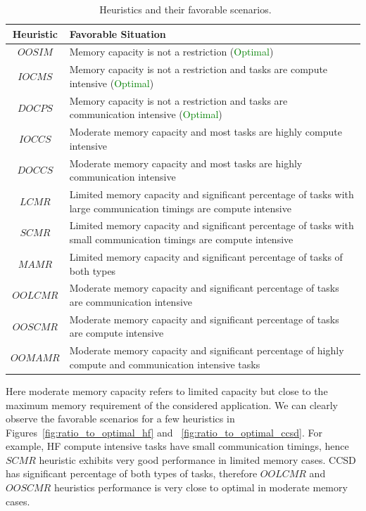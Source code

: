 \documentclass[sigconf]{acmart}
\begin{document}
{		
		\begin{table}[htb]
			\begin{tabular}{|c|p{6.5cm}|}
				\hline
				\textbf{Heuristic} & \textbf{\hspace{2cm}Favorable Situation} \\ \hline
				$OOSIM$ & Memory capacity is not a restriction (\textcolor{green}{Optimal}) \\ \hline
				$IOCMS$ & Memory capacity is not a restriction and tasks are compute intensive (\textcolor{green}{Optimal}) \\ \hline
				$DOCPS$ & Memory capacity is not a restriction and tasks are communication intensive (\textcolor{green}{Optimal}) \\ \hline
				$IOCCS$ & Moderate memory capacity and most tasks are highly compute intensive \\ \hline
				$DOCCS$ & Moderate memory capacity and most tasks are highly communication intensive \\ \hline
				$LCMR$ & Limited memory capacity and significant percentage of tasks with large communication timings are compute intensive\\ \hline
				$SCMR$ & Limited memory capacity and significant percentage of tasks with small communication timings are compute intensive\\ \hline
				$MAMR$ & Limited memory capacity and significant percentage of tasks of both types\\ \hline
				$OOLCMR$ & Moderate memory capacity and significant percentage of tasks are communication intensive\\ \hline
				$OOSCMR$ & Moderate memory capacity and significant percentage of tasks are compute intensive \\ \hline
				$OOMAMR$ & Moderate memory capacity and significant percentage of highly compute and communication intensive tasks \\ \hline
			\end{tabular}\caption{~\label{tab:heuristicsAndFavorableScenarios}Heuristics and their favorable scenarios.}
		\end{table}
		
		Here moderate memory capacity refers to limited capacity but close to the maximum memory requirement of the considered application. We can clearly observe the favorable scenarios for a few heuristics in Figures~\ref{fig:ratio_to_optimal_hf} and ~\ref{fig:ratio_to_optimal_ccsd}. For example, HF compute intensive tasks have small communication timings, hence $SCMR$ heuristic exhibits very good performance in limited memory cases. CCSD has significant percentage of both types of tasks, therefore $OOLCMR$ and $OOSCMR$ heuristics performance is very close to optimal in moderate memory cases. 
		
}
\end{document}
